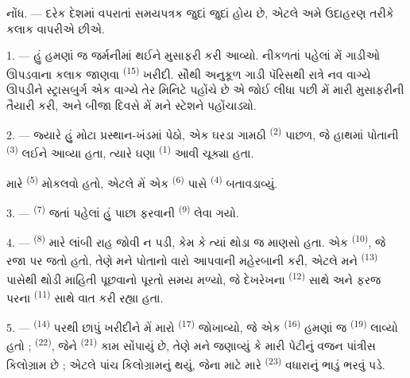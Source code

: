 \VUsaut{4.0mm}
\VUsaut{2.4mm}
\VUsaut{3.4mm}
\textsc{નોંધ.} --- દરેક દેશમાં વપરાતાં સમયપત્રક જુદાં જુદાં હોય છે,
એટલે અમે ઉદાહરણ તરીકે  કલાક વાપરીએ છીએ.

1. --- હું હમણાં જ જર્મનીમાં થઈને મુસાફરી કરી આવ્યો. નીકળતાં પહેલાં મેં
ગાડીઓ ઊપડવાના કલાક જાણવા  \textsuperscript{(15)}
ખરીદી. સૌથી અનુકૂળ ગાડી પૅરિસથી રાત્રે નવ વાગ્યે ઊપડીને સ્ટ્રાસબુર્ગ
એક વાગ્યે તેર મિનિટે પહોંચે છે એ જોઈ લીધા પછી મેં મારી મુસાફરીની
તૈયારી કરી, અને બીજા દિવસે મેં મને સ્ટેશને પહોંચાડ્યો.

2. --- જ્યારે હું મોટા પ્રસ્થાન-ખંડમાં પેઠો, એક ઘરડા ગામઠી
 \textsuperscript{(2)} પાછળ, જે હાથમાં પોતાની
 \textsuperscript{(3)} લઈને આવ્યા હતા, ત્યારે ઘણા
 \textsuperscript{(1)} આવી ચૂક્યા હતા.

મારે  \textsuperscript{(5)} મોકલવો હતો, એટલે મેં
એક  \textsuperscript{(6)} પાસે 
\textsuperscript{(4)} બતાવડાવ્યું.

3. ---  \textsuperscript{(7)} જતાં પહેલાં હું
પાછા ફરવાની  \textsuperscript{(9)} લેવા ગયો.

4. ---  \textsuperscript{(8)} મારે લાંબી રાહ જોવી ન
પડી, કેમ કે ત્યાં થોડા જ માણસો હતા. એક 
\textsuperscript{(10)}, જે રજા પર જતો હતો, તેણે મને પોતાનો વારો આપવાની
મહેરબાની કરી, એટલે મને  \textsuperscript{(13)}
પાસેથી થોડી માહિતી પૂછવાનો પૂરતો સમય મળ્યો, જે દેખરેખના
 \textsuperscript{(12)} સાથે અને ફરજ પરના
 \textsuperscript{(11)} સાથે વાત કરી રહ્યા હતા.

\VUsaut{3.0mm}

5. ---  \textsuperscript{(14)} પરથી છાપું
ખરીદીને મેં મારો  \textsuperscript{(17)} જોખાવ્યો, જે એક
 \textsuperscript{(16)} હમણાં જ  \textsuperscript{(19)} લાવ્યો હતો ; 
\textsuperscript{(22)}, જેને  \textsuperscript{(21)}
કામ સોંપાયું છે, તેણે મને જણાવ્યું કે મારી પેટીનું વજન પાંત્રીસ
કિલોગ્રામ છે ; એટલે પાંચ કિલોગ્રામનું  થયું, જેના
માટે મારે  \textsuperscript{(23)} વધારાનું ભાડું
ભરવું પડે.

